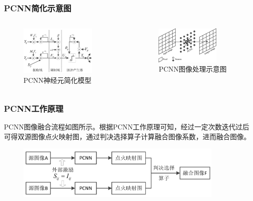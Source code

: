 \documentclass[10pt,aspectratio=43,mathserif]{beamer}
\begin{document}
\begin{frame}
		  \frametitle{\textbf{PCNN简化示意图}}
            \begin{columns}
                \begin{figure}[!t]
                    \centering
                    \includegraphics[width=0.8\textwidth]{./figures/pcnn/PCNN-sample.png}
                    \caption{PCNN神经元简化模型}
                \end{figure}

                \begin{figure}[!t]
                    \centering
                    \includegraphics[width=0.8\textwidth]{./figures/pcnn/PCNN-image-proc.png}
                    \caption{PCNN图像处理示意图}
                \end{figure}
        \end{columns}
    \end{frame}

\begin{frame}
		  \frametitle{\textbf{PCNN工作原理}}
        PCNN图像融合流程如图所示。根据PCNN工作原理可知，经过一定次数迭代过后可得双源图像点火映射图，通过判决选择算子计算融合图像系数，进而融合图像。
        \begin{figure}[!t]
            \centering
            \includegraphics[width=4in]{./figures/pcnn/PCNN-fusion.png}
            \end{figure}
    \end{frame}
\end{document}
